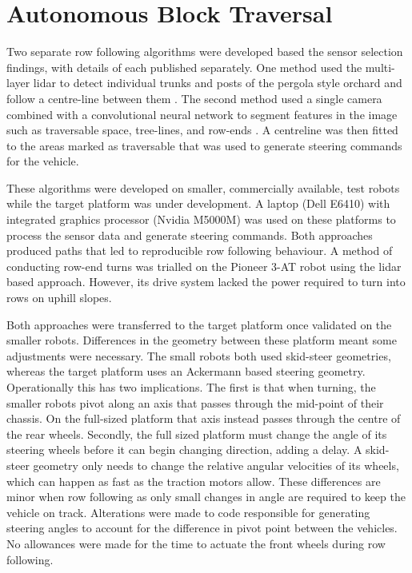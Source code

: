 \documentclass[preprint,authoryear,12pt]{elsarticle}
\begin{document}
\section{Autonomous Block Traversal}
\label{sect:autonomous}
    Two separate row following algorithms were developed based the sensor selection findings, with details of each published separately.
    One method used the multi-layer lidar to detect individual trunks and posts of the pergola style orchard and follow a centre-line between them \citep{Bell2016}.
    The second method used a single camera combined with a convolutional neural network to segment features in the image such as traversable space, tree-lines, and row-ends \citep{Bell2017}.
    A centreline was then fitted to the areas marked as traversable that was used to generate steering commands for the vehicle.

    These algorithms were developed on smaller, commercially available, test robots while the target platform was under development.
    A laptop (Dell E6410) with integrated graphics processor (Nvidia M5000M) was used on these platforms to process the sensor data and generate steering commands.
    Both approaches produced paths that led to reproducible row following behaviour.
    A method of conducting row-end turns was trialled on the Pioneer 3-AT robot using the lidar based approach.
    However, its drive system lacked the power required to turn into rows on uphill slopes.

    Both approaches were transferred to the target platform once validated on the smaller robots.
    Differences in the geometry between these platform meant some adjustments were necessary.
    The small robots both used skid-steer geometries, whereas the target platform uses an Ackermann based steering geometry.
    Operationally this has two implications.
    The first is that when turning, the smaller robots pivot along an axis that passes through the mid-point of their chassis.
    On the full-sized platform that axis instead passes through the centre of the rear wheels.
    Secondly, the full sized platform must change the angle of its steering wheels before it can begin changing direction, adding a delay.
    A skid-steer geometry only needs to change the relative angular velocities of its wheels, which can happen as fast as the traction motors allow.
    These differences are minor when row following as only small changes in angle are required to keep the vehicle on track.
    Alterations were made to code responsible for generating steering angles to account for the difference in pivot point between the vehicles.
    No allowances were made for the time to actuate the front wheels during row following.
\end{document}
